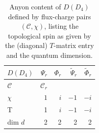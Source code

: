 \documentclass[two column]{article}
\begin{document}
\begin{table}
\vspace{0.5cm}
\begin{subtable}{\textwidth}
\raggedright
\begin{tabular}{l|rrrr}
$D(D_4)$  & $\Psi_{r}$ &  $\Phi_{r}$ & $\tilde{\Psi}_{r}$ & $\tilde{\Phi}_{r}$ \\ \hline
$\mathcal C$    & $\mathcal C_r$    &            &    &             \\ %
$\chi$ & $1$    & $ i$              & $-1$     & $- i$   \\           %
\hline
T  & 1 & $i$ & $-1$ & $-i$ \\
dim $d$ & 2 & 2 & 2 & 2
\end{tabular}
\end{subtable} 
\caption{  Anyon content of $D(D_4)$ defined by flux-charge pairs $(\mathcal C,\chi)$, listing the topological spin as given by the (diagonal) $T$-matrix entry and the quantum dimension. }\label{tab:anyons}
\end{table}
\end{document}
